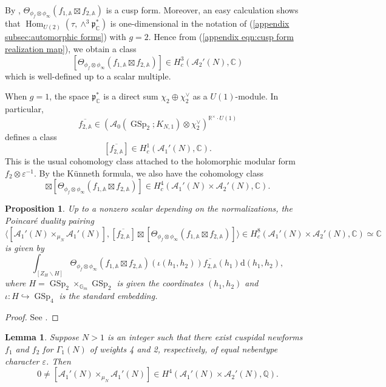 \documentclass[12pt]{amsart}
\def\bA{\mathbb{A}}
\newtheorem{lem}[thm]{Lemma}
\newtheorem{prop}[thm]{Proposition}
\theoremstyle{definition}
\newcommand{\C}{\mathbb{C}}
\newcommand{\Q}{\mathbb{Q}}
\newcommand{\R}{\mathbb{R}}
\DeclareMathOperator{\GSp}{GSp}
\renewcommand{\d}{\mathrm{d}}
\begin{document}
By \cite[Theorem 8.3]{roberts2001global}, $\Theta_{\phi_f\otimes\phi_\infty} (f_{1,\bA}\boxtimes f_{2,\bA}) $ is a cusp form. Moreover, an easy calculation shows that $\operatorname{Hom}_{U(2)}(\tau, \wedge^3 \mathfrak p_\C^\ast)$ is one-dimensional in the notation of (\ref{appendix subsec:automorphic forms}) with $g = 2$. Hence from (\ref{appendix eqn:cusp form realization map}), we obtain a class
\begin{equation}
    \left[\Theta_{\phi_f\otimes \phi_\infty} (f_{1,\bA}\boxtimes f_{2,\bA})\right]\in H^3_c (\mathcal A_2'(N), \C)
\end{equation}
which is well-defined up to a scalar multiple.

When $g = 1$, the space $\mathfrak p^\ast_\C$ is a direct sum $\chi_2 \oplus \chi_2^\vee$ as a $U(1)$-module. In particular, $$\overline {f_{2,\bA}} \in (\mathcal A_0(\GSp_2; K_{N,1})\otimes \chi_2^\vee)^{\R^\times\cdot U(1)}$$ defines a class $$[\overline {f_{2,\bA}}] \in H^1_c(\mathcal A_1'(N), \C).$$
This is the usual cohomology class attached to the holomorphic modular form $f_2\otimes \varepsilon^{-1}$. 
By the K\"unneth formula, we also have the cohomology class
\begin{equation}
      [\overline {f_{2,\bA}}] \boxtimes \left[\Theta_{\phi_f\otimes \phi_\infty} (f_{1,\bA}\boxtimes f_{2,\bA})\right]\in H^4_c(\mathcal A_1'(N)\times \mathcal A_2'(N), \C).
\end{equation}
\begin{prop}\label{appendix prop:pairing as period}
    Up to a nonzero scalar depending on the normalizations, the Poincar\'e duality pairing
  $$\langle \left[\mathcal A_1'(N)\times_{\mu_N}\mathcal A_1'(N)\right],  [\overline {f_{2,\bA}}] \boxtimes \left[\Theta_{\phi_f\otimes {\phi_\infty}} (f_{1,\bA}\boxtimes f_{2,\bA})\right]\rangle\in H^8_c(\mathcal A_1'(N) \times \mathcal A_2'(N), \C)\simeq \C$$ is given by  $$\int_{[Z_H \backslash H]}\Theta_{\phi_f\otimes \phi_\infty} (f_{1,\bA}\boxtimes f_{2,\bA})(\iota(h_1,h_2)) \overline {f_{2,\bA}} (h_1) \d(h_1,h_2),$$
    where $H = \GSp_2 \times_{\mathbb G_m} \GSp_2$ is given the coordinates $(h_1,h_2)$ and $\iota: H \hookrightarrow \GSp_4$ is the standard embedding. 
\end{prop}
\begin{proof}
    See \cite[Proposition 7.2.4]{sweeting2022tateclassesendoscopyoperatornamegsp4}.
\end{proof}
\begin{lem}\label{appendix lemma:newform condition for nontriviality}
Suppose $N > 1$ is an integer such that there exist cuspidal newforms $f_1$ and $f_2$ for $\Gamma_1(N)$ of weights 4 and 2, respectively, of equal nebentype character $\varepsilon$. Then 
$$0 \neq  \left[\mathcal A_1'(N)\times_{\mu_N} \mathcal A_1'(N)\right] \in H^4(\mathcal A_1'(N) \times \mathcal A_2'(N),\Q).$$
\end{lem}
\end{document}
